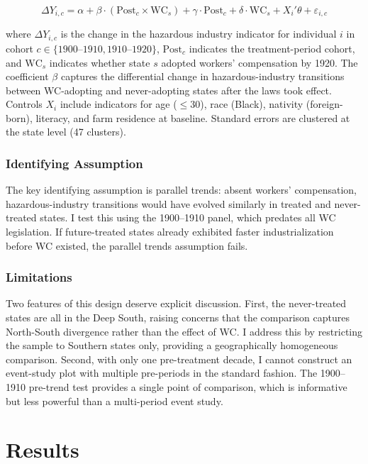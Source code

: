 \documentclass[12pt]{article}
\begin{document}
\begin{equation}\label{eq:did}
\Delta Y_{i,c} = \alpha + \beta \cdot (\text{Post}_c \times \text{WC}_s) + \gamma \cdot \text{Post}_c + \delta \cdot \text{WC}_s + X_i'\theta + \varepsilon_{i,c}
\end{equation}

\noindent where $\Delta Y_{i,c}$ is the change in the hazardous industry indicator for individual $i$ in cohort $c \in \{1900\text{--}1910, 1910\text{--}1920\}$, $\text{Post}_c$ indicates the treatment-period cohort, and $\text{WC}_s$ indicates whether state $s$ adopted workers' compensation by 1920. The coefficient $\beta$ captures the differential change in hazardous-industry transitions between WC-adopting and never-adopting states after the laws took effect. Controls $X_i$ include indicators for age ($\leq 30$), race (Black), nativity (foreign-born), literacy, and farm residence at baseline. Standard errors are clustered at the state level (47 clusters).

\subsubsection*{Identifying Assumption} The key identifying assumption is parallel trends: absent workers' compensation, hazardous-industry transitions would have evolved similarly in treated and never-treated states. I test this using the 1900--1910 panel, which predates all WC legislation. If future-treated states already exhibited faster industrialization before WC existed, the parallel trends assumption fails.

\subsubsection*{Limitations} Two features of this design deserve explicit discussion. First, the never-treated states are all in the Deep South, raising concerns that the comparison captures North-South divergence rather than the effect of WC. I address this by restricting the sample to Southern states only, providing a geographically homogeneous comparison. Second, with only one pre-treatment decade, I cannot construct an event-study plot with multiple pre-periods in the standard fashion. The 1900--1910 pre-trend test provides a single point of comparison, which is informative but less powerful than a multi-period event study.


\section{Results}\label{sec:results}
\end{document}

